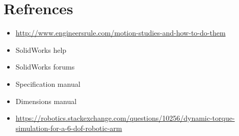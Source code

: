 \section{Refrences}
\begin{itemize}
	\item \url{http://www.engineersrule.com/motion-studies-and-how-to-do-them}
	\item SolidWorks help
	\item SolidWorks forums
	\item Specification manual
	\item Dimensions manual
	\item \url{https://robotics.stackexchange.com/questions/10256/dynamic-torque-simulation-for-a-6-dof-robotic-arm}
\end{itemize}